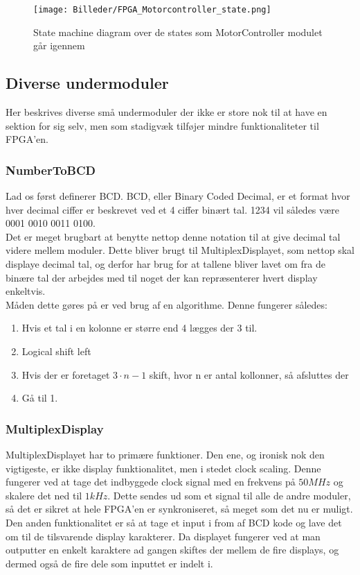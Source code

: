 \begin{figure}[ht]
	\begin{center}
		\texttt{[image: Billeder/FPGA\_Motorcontroller\_state.png]}
	\end{center}
\caption{State machine diagram over de states som MotorController modulet går igennem}
\label{fig:FPGA_MotorController_State}
\end{figure}

\subsection{Diverse undermoduler}
Her beskrives diverse små undermoduler der ikke er store nok til at have en sektion for sig selv, men som stadigvæk tilføjer mindre funktionaliteter til FPGA'en.

\subsubsection{NumberToBCD}

Lad os først definerer BCD. BCD, eller Binary Coded Decimal, er et format hvor hver decimal ciffer er beskrevet ved et 4 ciffer binært tal. 1234 vil således være 0001 0010 0011 0100.
\\
Det er meget brugbart at benytte nettop denne notation til at give decimal tal videre mellem moduler. Dette bliver brugt til MultiplexDisplayet, som nettop skal displaye decimal tal, og derfor har brug for at tallene bliver lavet om fra de binære tal der arbejdes med til noget der kan repræsenterer hvert display enkeltvis.
\\
Måden dette gøres på er ved brug af en algorithme. Denne fungerer således:

\begin{enumerate}
\item Hvis et tal i en kolonne er større end 4 lægges der 3 til.
\item Logical shift left
\item Hvis der er foretaget $3 \cdot n - 1$ skift, hvor n er antal kollonner, så afsluttes der
\item Gå til 1.
\end{enumerate}

\subsubsection{MultiplexDisplay}

MultiplexDisplayet har to primære funktioner. Den ene, og ironisk nok den vigtigeste, er ikke display funktionalitet, men i stedet clock scaling. Denne fungerer ved at tage det indbyggede clock signal med en frekvens på $50 MHz$ og skalere det ned til $1 kHz$. Dette sendes ud som et signal til alle de andre moduler, så det er sikret at hele FPGA'en er synkroniseret, så meget som det nu er muligt.
\\
Den anden funktionalitet er så at tage et input i from af BCD kode og lave det om til de tilsvarende display karakterer. Da displayet fungerer ved at man outputter en enkelt karaktere ad gangen skiftes der mellem de fire displays, og dermed også de fire dele som inputtet er indelt i.

